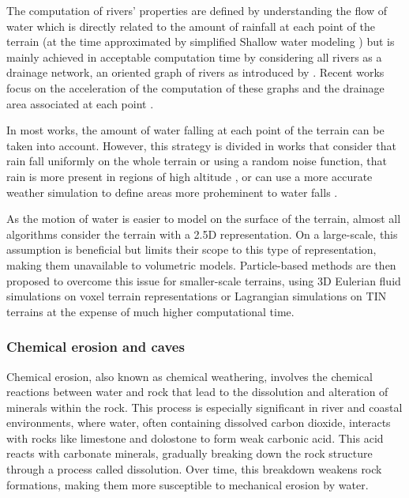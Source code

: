 The computation of rivers' properties are defined by understanding the flow of water which is directly related to the amount of rainfall at each point of the terrain \cite{Kelley1988} (at the time approximated by simplified Shallow water modeling \cite{Mei2007}) but is mainly achieved in acceptable computation time by considering all rivers as a drainage network, an oriented graph of rivers as introduced by \cite{Roudier1993}. Recent works focus on the acceleration of the computation of these graphs and the drainage area associated at each point \cite{Cordonnier2016,Schott2023}.

In most works, the amount of water falling at each point of the terrain can be taken into account. However, this strategy is divided in works that consider that rain fall uniformly on the whole terrain or using a random noise function, that rain is more present in regions of high altitude \cite{Neidhold2005}, or can use a more accurate weather simulation to define areas more proheminent to water falls \cite{Wojtek2022}.

As the motion of water is easier to model on the surface of the terrain, almost all algorithms consider the terrain with a 2.5D representation. On a large-scale, this assumption is beneficial but limits their scope to this type of representation, making them unavailable to volumetric models. Particle-based methods are then proposed to overcome this issue for smaller-scale terrains, using 3D Eulerian fluid simulations on voxel terrain representations \cite{Benes2006} or Lagrangian simulations on TIN terrains \cite{Kristof2009} at the expense of much higher computational time.

\subsubsection{Chemical erosion and caves}


Chemical erosion, also known as chemical weathering, involves the chemical reactions between water and rock that lead to the dissolution and alteration of minerals within the rock. This process is especially significant in river and coastal environments, where water, often containing dissolved carbon dioxide, interacts with rocks like limestone and dolostone to form weak carbonic acid. This acid reacts with carbonate minerals, gradually breaking down the rock structure through a process called dissolution. Over time, this breakdown weakens rock formations, making them more susceptible to mechanical erosion by water.

